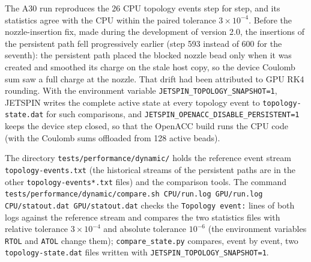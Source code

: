 The A30 run reproduces the 26 CPU topology events step for step,
and its statistics agree with the CPU within the paired tolerance
$3\times10^{-4}$.  Before the nozzle-insertion fix, made during the
development of version 2.0, the insertions of the persistent path fell progressively
earlier (step 593 instead of 600 for the seventh): the persistent path placed
the blocked nozzle bead only when it was created and smoothed its charge on
the stale host copy, so the device Coulomb sum saw a full charge at the
nozzle.  That drift had been attributed to GPU RK4 rounding.  With the
environment variable \texttt{JETSPIN\_TOPOLOGY\_SNAPSHOT=1}, JETSPIN writes
the complete active state at every topology event to
\texttt{topology-state.dat} for such comparisons, and
\texttt{JETSPIN\_OPENACC\_DISABLE\_PERSISTENT=1} keeps the device step
closed, so that the OpenACC build runs the CPU code (with the Coulomb sums
offloaded from 128 active beads).

The directory \texttt{tests/performance/dynamic/} holds the reference event
stream \texttt{topology-events.txt} (the historical streams of the
persistent paths are in the other \texttt{topology-events*.txt} files) and
the comparison tools. The command
\texttt{tests/performance/dynamic/compare.sh CPU/run.log GPU/run.log
CPU/statout.dat GPU/statout.dat} checks the \texttt{Topology event:} lines
of both logs against the reference stream and compares the two statistics
files with relative tolerance $3\times10^{-4}$ and absolute tolerance
$10^{-6}$ (the environment variables \texttt{RTOL} and \texttt{ATOL}
change them); \texttt{compare\_state.py} compares, event by event, two
\texttt{topology-state.dat} files written with
\texttt{JETSPIN\_TOPOLOGY\_SNAPSHOT=1}.
